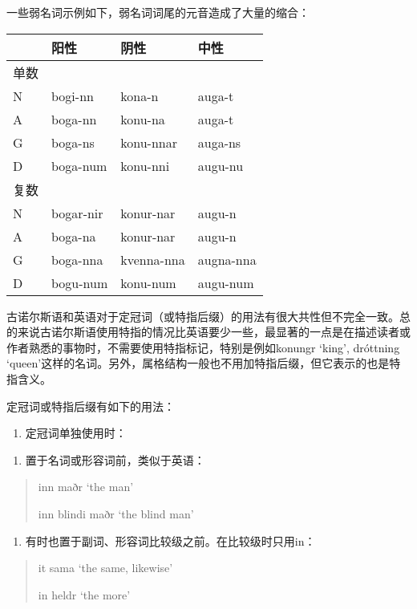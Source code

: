 一些弱名词示例如下，弱名词词尾的元音造成了大量的缩合：

\begin{longtable}{llll}
\toprule
 & 阳性 & 阴性 & 中性 \\
\midrule
\endhead
\bottomrule
\endfoot
单数 & & & \\
N & bogi-nn & kona-n & auga-t \\
A & boga-nn & konu-na & auga-t \\
G & boga-ns & konu-nnar & auga-ns \\
D & boga-num & konu-nni & augu-nu \\
复数 & & & \\
N & bogar-nir & konur-nar & augu-n \\
A & boga-na & konur-nar & augu-n \\
G & boga-nna & kvenna-nna & augna-nna \\
D & bogu-num & konu-num & augu-num \\
\end{longtable}

古诺尔斯语和英语对于定冠词（或特指后缀）的用法有很大共性但不完全一致。总的来说古诺尔斯语使用特指的情况比英语要少一些，最显著的一点是在描述读者或作者熟悉的事物时，不需要使用特指标记，特别是例如konungr
`king', dróttning
`queen'这样的名词。另外，属格结构一般也不用加特指后缀，但它表示的也是特指含义。

定冠词或特指后缀有如下的用法：

\begin{enumerate}
\def\labelenumi{\Alph{enumi}.}
\item
  定冠词单独使用时：
\end{enumerate}

\begin{enumerate}
\def\labelenumi{\arabic{enumi})}
\item
  置于名词或形容词前，类似于英语：
\end{enumerate}

\begin{quote}
inn maðr `the man'

inn blindi maðr `the blind man'
\end{quote}

\begin{enumerate}
\def\labelenumi{\arabic{enumi})}
\setcounter{enumi}{1}
\item
  有时也置于副词、形容词比较级之前。在比较级时只用in：
\end{enumerate}

\begin{quote}
it sama `the same, likewise'

in heldr `the more'
\end{quote}

